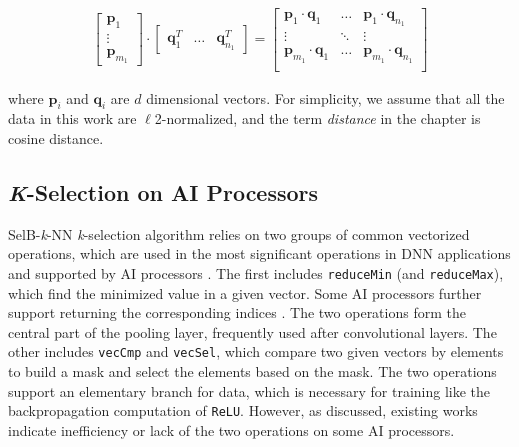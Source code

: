 \begin{equation}
    \label{eq:dot_products}
    \begin{aligned}
    \begin{bmatrix} 
        \boldsymbol{p}_{1} \\
        \vdots \\
        \boldsymbol{p}_{m_1}
    \end{bmatrix}
    \cdot
    \begin{bmatrix} 
        \boldsymbol{q}_{1}^{T} &
        \dots &
        \boldsymbol{q}_{n_1}^{T}
    \end{bmatrix}
    =
    \begin{bmatrix} 
        \boldsymbol{p}_{1} \cdot \boldsymbol{q}_{1} &
        \dots &
        \boldsymbol{p}_{1} \cdot \boldsymbol{q}_{n_1} \\
        \vdots & \ddots & \vdots \\
        \boldsymbol{p}_{m_1} \cdot \boldsymbol{q}_{1} &
        \dots &
        \boldsymbol{p}_{m_1} \cdot \boldsymbol{q}_{n_1} \\
    \end{bmatrix}
    \end{aligned}
    \end{equation}

where $\boldsymbol{p}_{i}$ and $\boldsymbol{q}_{i}$ are $d$ dimensional vectors. For simplicity, we assume that all the data in this work are $\ell$2-normalized, and the term \textit{distance} in the chapter is cosine distance.

\subsection{\textit{K}-Selection on AI Processors}

SelB-\textit{k}-NN \textit{k}-selection algorithm relies on two groups of common vectorized operations, which are used in the most significant operations in DNN applications and supported by AI processors \cite{CANN, jax, cambricon}. The first includes \verb|reduceMin| (and \verb|reduceMax|), which find the minimized value in a given vector. Some AI processors further support returning the corresponding indices \cite{CANN}. The two operations form the central part of the pooling layer, frequently used after convolutional layers. The other includes \verb|vecCmp| and \verb|vecSel|, which compare two given vectors by elements to build a mask and select the elements based on the mask. The two operations support an elementary branch for data, which is necessary for training like the backpropagation computation of \verb|ReLU|. However, as discussed, existing works \cite{DBLP:conf/icpp/JiW21, cambricon, CANN} indicate inefficiency or lack of the two operations on some AI processors.

